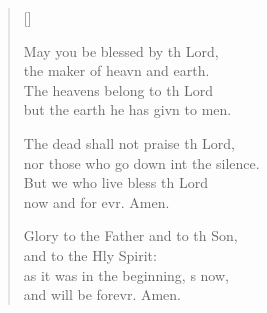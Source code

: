 \begin{verse}[\versewidth]
\begin{patverse}
May you be blessed by th Lord,\Med\\
the maker of heavn and earth.\\
The heavens belong to th Lord\Med\\
but the earth he has givn to men.

The dead shall not praise th Lord,\Med\\
nor those who go down int the silence.\\
But we who live bless th Lord\Med\\
now and for evr. Amen.

Glory to the Father and to th Son,\Med\\
and to the Hly Spirit:\\
as it was in the beginning, \pointup{\i}s now,\Med\\
and will be forevr. Amen. 
  \end{patverse}
\end{verse}
